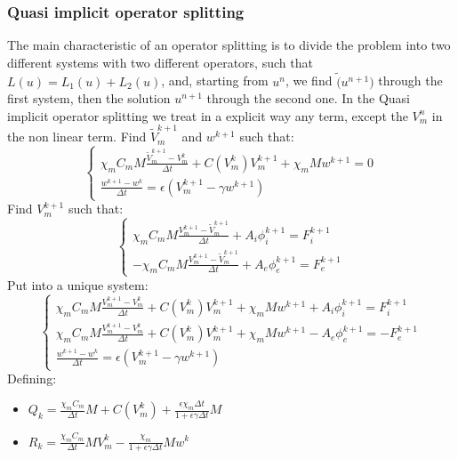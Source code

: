 \documentclass[a4paper,12pt]{article}
\begin{document}
\subsubsection{Quasi implicit operator splitting}
The main characteristic of an operator splitting is to divide the problem into two different systems with two different operators, such that $L(u)=L_1(u)+L_2(u)$, and, starting from $u^n$, we find $\tilde(u^{n+1})$ through the first system, then the solution $u^{n+1}$ through the second one.
In the Quasi implicit operator splitting we treat in a explicit way any term, except the $V_m^n$ in the non linear term.\newline
Find $\tilde{V}_m^{k+1}$ and $w^{k+1}$ such that:
\begin{equation}
\begin{cases}
\chi_m C_m M \frac{\tilde{V}_m^{k+1}-V_m^k}{\Delta t} +  C(V_m^k) V_m^{k+1} + \chi_m M w^{k+1}= 0\\
\frac{w^{k+1} - w^k}{\Delta t} = \epsilon (V_m^{k+1}-\gamma w^{k+1})
\end{cases}
\end{equation}
Find $V_m^{k+1}$ such that:
\begin{equation}
\begin{cases}
\chi_m C_m M \frac{V_m^{k+1}-\tilde{V}_m^{k+1}}{\Delta t} + A_i \phi_i^{k+1}= F_i^{k+1}\\
- \chi_m C_m M \frac{V_m^{k+1}-\tilde{V}_m^{k+1}}{\Delta t} + A_e \phi_e^{k+1}= F_e^{k+1}
\end{cases}
\end{equation}
Put into a unique system:
\begin{equation}\label{Quasi}
\begin{cases}
\chi_m C_m M \frac{V_m^{k+1}-V_m^{k}}{\Delta t} + C(V_m^k) V_m^{k+1} + \chi_m M w^{k+1} + A_i \phi_i ^{k+1} = F_i^{k+1} \\
\chi_m C_m M \frac{V_m^{k+1}-V_m^{k}}{\Delta t} +  C(V_m^k) V_m^{k+1} + \chi_m M w^{k+1} - A_e \phi_e ^{k+1} =  -F_e^{k+1} \\
\frac{w^{k+1}-w^{k}}{\Delta t} = \epsilon(V_m^{k+1}-\gamma w^{k+1})
\end{cases}
\end{equation}
Defining:
\begin{itemize}
\item $Q_k = \frac{\chi_m C_m}{\Delta t}M + C(V_m^k) + \frac{\epsilon\chi_m \Delta t}{1 + \epsilon \gamma \Delta t} M$ \\
\item $R_k = \frac{\chi_mC_m}{\Delta t}MV_m^k - \frac{\chi_m}{1+\epsilon\gamma\Delta t}M w^k$
\end{itemize}
\end{document}
